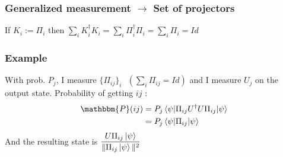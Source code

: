 \documentclass{article}
\begin{document}
\subsubsection*{Generalized measurement $\rightarrow$ Set of projectors}
If $K_i := \Pi_i$ then $\sum_i K_i^\dagger K_i = \sum_i \Pi_i^\dagger\Pi_i = \sum_i \Pi_i = Id$

\subsubsection*{Example}
With prob. $P_j$, I measure $\{\Pi_{ij}\}_i \text{ } (\sum_i \Pi_{ij} = Id)$ and I measure
$U_j$ on the output state.
Probability of getting $ij$ :
\begin{equation}
    \begin{aligned}
        \mathbbm{P}(ij)
            &= P_j\braket{\psi | \Pi_{ij} U^\dagger U \Pi_{ij} | \psi} \\
            &= P_j\braket{\psi|\Pi_{ij}|\psi}
    \end{aligned}
\end{equation}
\noindent
And the resulting state is $\dfrac{U\Pi_{ij}\ket{\psi}}{\|\Pi_{ij}\ket{\psi}\|^2}$
\end{document}
